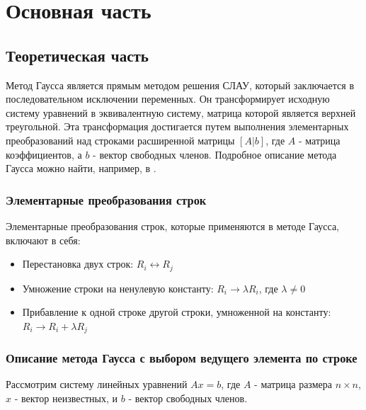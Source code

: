 \chapter*{Основная часть}
\label{cha:analysis}

\setcounter{section}{0} %
\renewcommand\thesection{\arabic{section}} %

\section{Теоретическая часть}

Метод Гаусса является прямым методом решения СЛАУ, который заключается в последовательном исключении переменных. Он трансформирует исходную систему уравнений в эквивалентную систему, матрица которой является верхней треугольной. Эта трансформация достигается путем выполнения элементарных преобразований над строками расширенной матрицы $[A|b]$, где $A$ - матрица коэффициентов, а $b$ - вектор свободных членов. Подробное описание метода Гаусса можно найти, например, в \cite{krivosonova2005numerical}.

\subsection*{Элементарные преобразования строк}
Элементарные преобразования строк, которые применяются в методе Гаусса, включают в себя:
\begin{itemize}
    \item Перестановка двух строк: $R_i \leftrightarrow R_j$
    \item Умножение строки на ненулевую константу: $R_i \rightarrow \lambda R_i$, где $\lambda \ne 0$
    \item Прибавление к одной строке другой строки, умноженной на константу: $R_i \rightarrow R_i + \lambda R_j$
\end{itemize}

\subsection*{Описание метода Гаусса с выбором ведущего элемента по строке}

Рассмотрим систему линейных уравнений $Ax = b$, где $A$ - матрица размера $n \times n$, $x$ - вектор неизвестных, и $b$ - вектор свободных членов.


